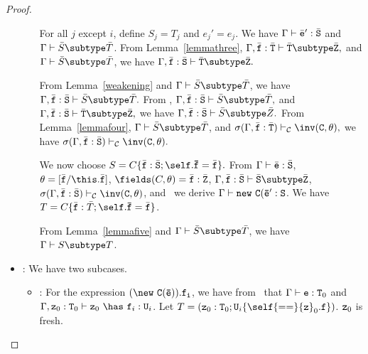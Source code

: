 \begin{proof}
\begin{itemize}
\begin{itemize}
            For all $j$ except $i$, define $S_j = T_j$ and $e_j' = e_j$.
            We have 
            $\Gamma \vdash \bar{\tt e}': \bar{\tt S}$ and
            $\Gamma \vdash \bar{S} \subtype \bar{T}$.
            From Lemma~\ref{lemmathree},
            $\Gamma, \bar{\tt f}: \bar{\tt T} \vdash
                    \bar{\tt T} \subtype \bar{\tt Z},$
            and $\Gamma \vdash \bar{S} \subtype \bar{T}$, we have
            $\Gamma, \bar{\tt f}: \bar{\tt S} \vdash
                    \bar{\tt T} \subtype \bar{\tt Z}.$

            From Lemma~\ref{weakening} and 
            $\Gamma \vdash \bar{S} \subtype \bar{T}$, 
            we have 
            $\Gamma, \bar{\tt f}: \bar{\tt S} \vdash \bar{S} \subtype \bar{T}.$
            From ,
            $\Gamma, \bar{\tt f}: \bar{\tt S} \vdash \bar{S} \subtype \bar{T},$
            and
            $\Gamma, \bar{\tt f}: \bar{\tt S} \vdash
                    \bar{\tt T} \subtype \bar{\tt Z},$ we have
            $\Gamma, \bar{\tt f}: \bar{\tt S} \vdash \bar{S} \subtype \bar{Z}.$
            From Lemma~\ref{lemmafour}, 
            $\Gamma \vdash \bar{S} \subtype \bar{T}$, and
            $\sigma(\Gamma, \bar{\tt f}: \bar{\tt T}) \vdash_{\cal C}
                    \inv({\tt C},\theta),$
            we have
            $\sigma(\Gamma, \bar{\tt f}: \bar{\tt S}) \vdash_{\cal C}
                    \inv({\tt C},\theta).$

            We now choose 
              $S=C\{\bar{\tt f}: \bar{\tt S}{\tt ;\self.\bar{f}}=\bar{\tt f}\}.$
            From 
            $\Gamma \vdash \bar{\tt e}: \bar{\tt S}$,
            $\theta=[\bar{\tt f}/\this.\bar{\tt f}]$,
            $\fields(C,\theta)=\bar{\tt f}: \bar{\tt Z}$,
            $\Gamma, \bar{\tt f}: \bar{\tt S} \vdash
                    \bar{\tt S} \subtype \bar{\tt Z}$,
            $\sigma(\Gamma, \bar{\tt f}: \bar{\tt S}) \vdash_{\cal C}
                    \inv({\tt C},\theta)$, and \TNew\ we derive
            $\Gamma \vdash {\tt new\ C(\bar{e}'}: {\tt S}$.
            We have 
               $T=C\{\bar{\tt f}: \bar{T}{\tt ;\self.\bar{f}}=\bar{\tt f}\}$.

            From Lemma~\ref{lemmafive} and
            $\Gamma \vdash \bar{S} \subtype \bar{T}$, we have
            $\Gamma \vdash S \subtype T$.
   \end{itemize}
\item
\TField: We have two subcases.
   \begin{itemize}
   \item
   \RField:  For the expression ${\tt (\new\ C(\bar{e})).f_i}$, 
             we have from \TField\ that
             $\Gamma \vdash {\tt e}: {\tt T}_0$ and
             $\Gamma, {\tt z}_0: {\tt T}_0 \vdash {\tt z}_0\ \has\ {\tt f}_i: {\tt U}_i$.
             Let $T = ({\tt z}_0: {\tt T}_0; {\tt U}_i\{\self{\tt ==}{\tt z}_0.{\tt f}\})$.
             ${\tt z}_0$ is fresh.


\end{itemize}
\end{itemize}
\end{proof}
